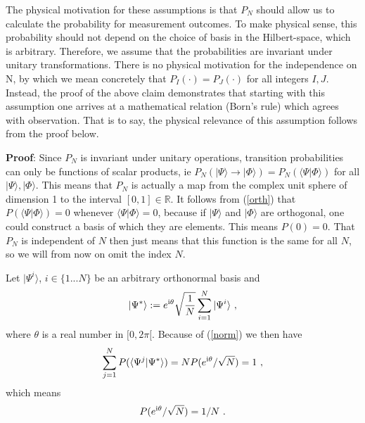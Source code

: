 \documentclass[12pt]{article}
\def\beqn{\begin{eqnarray}}
\def\eeqn{\end{eqnarray}}
\begin{document}
The physical motivation for these assumptions is that $P_N$ should allow us to calculate the probability for measurement outcomes. To make physical sense, this probability should not depend on the choice of basis in the Hilbert-space, which is arbitrary. Therefore, we assume that the probabilities are invariant under unitary transformations. There is no physical motivation for the independence on N, by which we mean concretely that $P_I(\cdot) = P_J(\cdot)$ for all integers $I,J$. Instead, the proof of the above claim demonstrates that starting with this assumption one arrives at a mathematical relation (Born’s rule) which agrees with observation. That is to say, the physical relevance of this assumption follows from the proof below.

\bigskip

{\bf Proof}: Since $P_N$ is invariant under unitary operations, transition probabilities can only be functions of scalar products, ie 
$P_N(|\Psi \rangle \to |\Phi \rangle)  = P_N(\langle \Psi |\Phi \rangle)$ for all $|\Psi \rangle, |\Phi \rangle$. This means that $P_N$ is actually a map from the complex unit sphere of dimension 1 to the interval $[ 0,1] \in {\mathbb{R}}$. It follows from (\ref{orth}) that $P(\langle \Psi | \Phi \rangle) = 0$ whenever $\langle \Psi | \Phi \rangle =0$, because if $|\Psi \rangle$ and $|\Phi \rangle$ are orthogonal, one could construct a basis of which they are elements. This means $P(0) = 0$. That $P_N$ is independent of $N$ then just means that this function is the same for all $N$, so we will from now on omit the index $N$. 

Let $|\Psi^i \rangle$, $i \in \{1... N \}$ be an arbitrary orthonormal basis and
\beqn
|\Psi^* \rangle := e^{{\rm i} \theta} \sqrt{\frac{1}{N}} \sum_{i=1}^N |\Psi^i \rangle~,
\eeqn
where $\theta$ is a real number in $[0,2 \pi [$. Because of (\ref{norm}) we then have
\beqn
\sum_{j=1}^N P (\langle \Psi^j | \Psi^* \rangle)  = N  P( e^{{\rm i} \theta}/\sqrt{N}) =  1~,
\eeqn
which means
\beqn
P( e^{{\rm i} \theta} /\sqrt{N}) = 1/N ~. \label{1/N}
\eeqn
\end{document}
